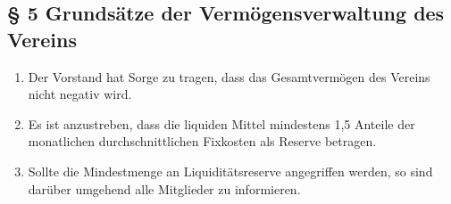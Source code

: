\documentclass[10pt,a4paper]{article}
\begin{document}
\subsection*{§ 5 Grundsätze der Vermögensverwaltung des Vereins}
\begin{enumerate}
\item Der Vorstand hat Sorge zu tragen, dass das Gesamtvermögen des Vereins nicht negativ wird.
\item Es ist anzustreben, dass die liquiden Mittel mindestens 1,5 Anteile der monatlichen durchschnittlichen Fixkosten als Reserve betragen.
\item Sollte die Mindestmenge an Liquiditätsreserve angegriffen werden, so sind darüber umgehend alle Mitglieder zu informieren.
\end{enumerate}

%
%
\end{document}

